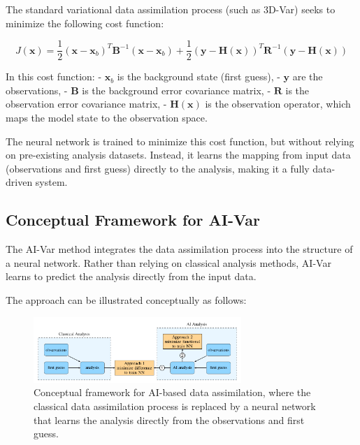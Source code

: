 The standard variational data assimilation process (such as 3D-Var) seeks to minimize the following cost function:

\[
J(\mathbf{x}) = \frac{1}{2} (\mathbf{x} - \mathbf{x}_b)^T \mathbf{B}^{-1} (\mathbf{x} - \mathbf{x}_b) + \frac{1}{2} (\mathbf{y} - \mathbf{H}(\mathbf{x}))^T \mathbf{R}^{-1} (\mathbf{y} - \mathbf{H}(\mathbf{x}))
\]

In this cost function:
- \( \mathbf{x}_b \) is the background state (first guess),
- \( \mathbf{y} \) are the observations,
- \( \mathbf{B} \) is the background error covariance matrix,
- \( \mathbf{R} \) is the observation error covariance matrix,
- \( \mathbf{H}(\mathbf{x}) \) is the observation operator, which maps the model state to the observation space.

The neural network is trained to minimize this cost function, but without relying on pre-existing analysis datasets. Instead, it learns the mapping from input data (observations and first guess) directly to the analysis, making it a fully data-driven system.

%
\subsection{Conceptual Framework for AI-Var}

The AI-Var method integrates the data assimilation process into the structure of a neural network. Rather than relying on classical analysis methods, AI-Var learns to predict the analysis directly from the input data.


The approach can be illustrated conceptually as follows:

\begin{figure}[ht]
\centering
\includegraphics[width=0.7\textwidth]{images/aivar1.png}
\caption{Conceptual framework for AI-based data assimilation, where the classical data assimilation process is replaced by a neural network that learns the analysis directly from the observations and first guess.}
\end{figure}

